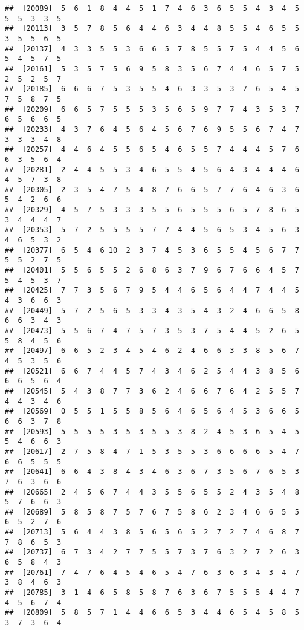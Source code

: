 \documentclass[
]{book}
\begin{document}
\begin{verbatim}
##  [20089]  5  6  1  8  4  4  5  1  7  4  6  3  6  5  5  4  3  4  5  5  5  3  3  5
##  [20113]  3  5  7  8  5  6  4  4  6  3  4  4  8  5  5  4  6  5  5  3  5  5  6  5
##  [20137]  4  3  3  5  5  3  6  6  5  7  8  5  5  7  5  4  4  5  6  5  4  5  7  5
##  [20161]  5  3  5  7  5  6  9  5  8  3  5  6  7  4  4  6  5  7  5  2  5  2  5  7
##  [20185]  6  6  6  7  5  3  5  5  4  6  3  3  5  3  7  6  5  4  5  7  5  8  7  5
##  [20209]  6  6  5  7  5  5  5  3  5  6  5  9  7  7  4  3  5  3  7  6  5  6  6  5
##  [20233]  4  3  7  6  4  5  6  4  5  6  7  6  9  5  5  6  7  4  7  3  3  3  4  8
##  [20257]  4  4  6  4  5  5  6  5  4  6  5  5  7  4  4  4  5  7  6  6  3  5  6  4
##  [20281]  2  4  4  5  5  3  4  6  5  5  4  5  6  4  3  4  4  4  6  4  5  7  3  8
##  [20305]  2  3  5  4  7  5  4  8  7  6  6  5  7  7  6  4  6  3  6  5  4  2  6  6
##  [20329]  4  5  7  5  3  3  3  5  5  6  5  5  5  6  5  7  8  6  5  3  4  4  4  7
##  [20353]  5  7  2  5  5  5  5  7  7  4  4  5  6  5  3  4  5  6  3  4  6  5  3  2
##  [20377]  6  5  4  6 10  2  3  7  4  5  3  6  5  5  4  5  6  7  7  5  5  2  7  5
##  [20401]  5  5  6  5  5  2  6  8  6  3  7  9  6  7  6  6  4  5  7  5  4  5  3  7
##  [20425]  7  7  3  5  6  7  9  5  4  4  6  5  6  4  4  7  4  4  5  4  3  6  6  3
##  [20449]  5  7  2  5  6  5  3  3  4  3  5  4  3  2  4  6  6  5  8  6  6  3  4  3
##  [20473]  5  5  6  7  4  7  5  7  3  5  3  7  5  4  4  5  2  6  5  5  8  4  5  6
##  [20497]  6  6  5  2  3  4  5  4  6  2  4  6  6  3  3  8  5  6  7  4  5  3  5  6
##  [20521]  6  6  7  4  4  5  7  4  3  4  6  2  5  4  4  3  8  5  6  6  6  5  6  4
##  [20545]  5  4  3  8  7  7  3  6  2  4  6  6  7  6  4  2  5  5  7  4  4  3  4  6
##  [20569]  0  5  5  1  5  5  8  5  6  4  6  5  6  4  5  3  6  6  5  6  6  3  7  8
##  [20593]  5  5  5  5  3  5  3  5  5  3  8  2  4  5  3  6  5  4  5  5  4  6  6  3
##  [20617]  2  7  5  8  4  7  1  5  3  5  5  3  6  6  6  6  5  4  7  6  6  5  5  5
##  [20641]  6  6  4  3  8  4  3  4  6  3  6  7  3  5  6  7  6  5  3  7  6  3  6  6
##  [20665]  2  4  5  6  7  4  4  3  5  5  6  5  5  2  4  3  5  4  8  5  7  6  6  3
##  [20689]  5  8  5  8  7  5  7  6  7  5  8  6  2  3  4  6  6  5  5  6  5  2  7  6
##  [20713]  5  6  4  4  3  8  5  6  5  6  5  2  7  2  7  4  6  8  7  7  8  6  5  3
##  [20737]  6  7  3  4  2  7  7  5  5  7  3  7  6  3  2  7  2  6  3  6  5  8  4  3
##  [20761]  7  4  7  6  4  5  4  6  5  4  7  6  3  6  3  4  3  4  7  3  8  4  6  3
##  [20785]  3  1  4  6  5  8  5  8  7  6  3  6  7  5  5  5  4  4  7  4  5  6  7  4
##  [20809]  5  8  5  7  1  4  4  6  6  5  3  4  4  6  5  4  5  8  5  3  7  3  6  4

\end{verbatim}
\end{document}

